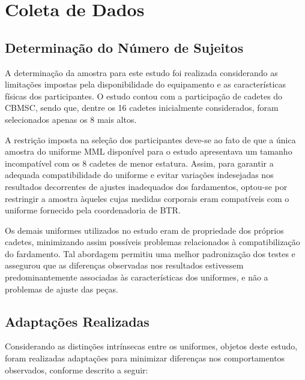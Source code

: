 \chapter{Coleta de Dados}
\section{Determinação do Número de Sujeitos}

A determinação da amostra para este estudo foi realizada considerando as limitações impostas pela disponibilidade do equipamento e as características físicas dos participantes. O estudo contou com a participação de cadetes do \acrlong{CBMSC}, sendo que, dentre os 16 cadetes inicialmente considerados, foram selecionados apenas os 8 mais altos.

\tab A restrição imposta na seleção dos participantes deve-se ao fato de que a única amostra do uniforme \acrlong{MML} disponível para o estudo apresentava um tamanho incompatível com os 8 cadetes de menor estatura. Assim, para garantir a adequada compatibilidade do uniforme e evitar variações indesejadas nos resultados decorrentes de ajustes inadequados dos fardamentos, optou-se por restringir a amostra àqueles cujas medidas corporais eram compatíveis com o uniforme fornecido pela coordenadoria de \acrlong{BTR}.

\tab Os demais uniformes utilizados no estudo eram de propriedade dos próprios cadetes, minimizando assim possíveis problemas relacionados à compatibilização do fardamento. Tal abordagem permitiu uma melhor padronização dos testes e assegurou que as diferenças observadas nos resultados estivessem predominantemente associadas às características dos uniformes, e não a problemas de ajuste das peças.

\section{Adaptações Realizadas}

Considerando as distinções intrínsecas entre os uniformes, objetos deste estudo, foram realizadas adaptações para minimizar diferenças nos comportamentos observados, conforme descrito a seguir:

